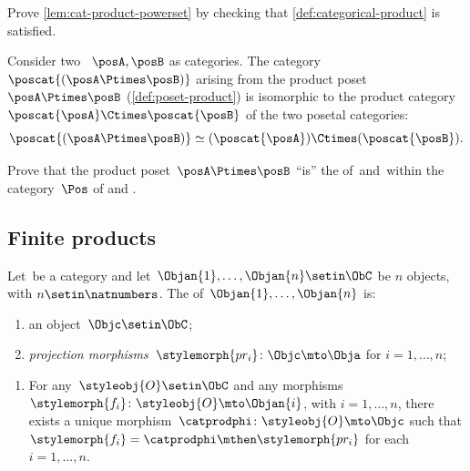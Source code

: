\vfill
\begin{gradedexercise}
    \label{ex:CatProductPowerset}
    Prove \cref{lem:cat-product-powerset} by checking that \cref{def:categorical-product} is satisfied.
\end{gradedexercise}


\begin{example}
    Consider two ~$\posA,\posB$ as categories.
    The category~$\poscat{(\posA\Ptimes \posB)}$ arising from the product poset~$\posA\Ptimes \posB$ (\cref{def:poset-product}) is isomorphic to the product category~$\poscat{\posA} \Ctimes \poscat{\posB}$ of the two posetal categories:
    \begin{equation}
        \poscat{(\posA\Ptimes \posB)} \simeq (\poscat{\posA}) \Ctimes (\poscat{\posB}).
    \end{equation}
\end{example}

\begin{gradedexercise}
    \label{ex:PosetProductCategorical}
    Prove that the product poset~$\posA \Ptimes \posB$ ``is'' the  of~\posA and~\posB within the category~$\Pos$ of  and .
\end{gradedexercise}


\subsection{Finite products}

\begin{ctdefinition}
    \label{def:finite-categorical-product}
    Let~\CatC be a category and let~$\Objan{1}, \dots, \Objan{n} \setin \ObC$ be $n$ objects, with $n \setin \natnumbers$.
    The  of~$\Objan{1}, \dots, \Objan{n}$ is: \\
    \constit
    \begin{enumerate}
        \item an object~$\Objc \setin \ObC$;
        \item \emph{projection morphisms}~$\stylemorph{pr_i} \colon \Objc \mto \Obja$ for $i =1, \dots, n$;
    \end{enumerate}
    \condit
    \begin{enumerate}
        \item For any~$\styleobj{O} \setin \ObC$ and any morphisms~$\stylemorph{f_i} \colon \styleobj{O} \mto \Objan{i}$, with $i = 1, \dots, n$, there exists a unique morphism~$\catprodphi \colon \styleobj{O} \mto \Objc$ such that $\stylemorph{f_i} = \catprodphi \mthen \stylemorph{pr_i}$ for each $i = 1, \dots, n$.
    \end{enumerate}
\end{ctdefinition}


